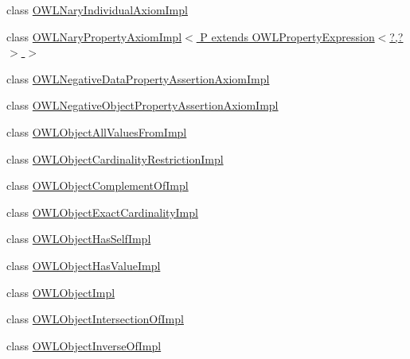 \begin{DoxyCompactItemize}
\item 
class \hyperlink{classuk_1_1ac_1_1manchester_1_1cs_1_1owl_1_1owlapi_1_1_o_w_l_nary_individual_axiom_impl}{O\-W\-L\-Nary\-Individual\-Axiom\-Impl}
\item 
class \hyperlink{classuk_1_1ac_1_1manchester_1_1cs_1_1owl_1_1owlapi_1_1_o_w_l_nary_property_axiom_impl_3_01_p_01ebb131bf5bfcb769e964dbdcf75a7ae4d}{O\-W\-L\-Nary\-Property\-Axiom\-Impl$<$ P extends O\-W\-L\-Property\-Expression$<$?,?$>$ $>$}
\item 
class \hyperlink{classuk_1_1ac_1_1manchester_1_1cs_1_1owl_1_1owlapi_1_1_o_w_l_negative_data_property_assertion_axiom_impl}{O\-W\-L\-Negative\-Data\-Property\-Assertion\-Axiom\-Impl}
\item 
class \hyperlink{classuk_1_1ac_1_1manchester_1_1cs_1_1owl_1_1owlapi_1_1_o_w_l_negative_object_property_assertion_axiom_impl}{O\-W\-L\-Negative\-Object\-Property\-Assertion\-Axiom\-Impl}
\item 
class \hyperlink{classuk_1_1ac_1_1manchester_1_1cs_1_1owl_1_1owlapi_1_1_o_w_l_object_all_values_from_impl}{O\-W\-L\-Object\-All\-Values\-From\-Impl}
\item 
class \hyperlink{classuk_1_1ac_1_1manchester_1_1cs_1_1owl_1_1owlapi_1_1_o_w_l_object_cardinality_restriction_impl}{O\-W\-L\-Object\-Cardinality\-Restriction\-Impl}
\item 
class \hyperlink{classuk_1_1ac_1_1manchester_1_1cs_1_1owl_1_1owlapi_1_1_o_w_l_object_complement_of_impl}{O\-W\-L\-Object\-Complement\-Of\-Impl}
\item 
class \hyperlink{classuk_1_1ac_1_1manchester_1_1cs_1_1owl_1_1owlapi_1_1_o_w_l_object_exact_cardinality_impl}{O\-W\-L\-Object\-Exact\-Cardinality\-Impl}
\item 
class \hyperlink{classuk_1_1ac_1_1manchester_1_1cs_1_1owl_1_1owlapi_1_1_o_w_l_object_has_self_impl}{O\-W\-L\-Object\-Has\-Self\-Impl}
\item 
class \hyperlink{classuk_1_1ac_1_1manchester_1_1cs_1_1owl_1_1owlapi_1_1_o_w_l_object_has_value_impl}{O\-W\-L\-Object\-Has\-Value\-Impl}
\item 
class \hyperlink{classuk_1_1ac_1_1manchester_1_1cs_1_1owl_1_1owlapi_1_1_o_w_l_object_impl}{O\-W\-L\-Object\-Impl}
\item 
class \hyperlink{classuk_1_1ac_1_1manchester_1_1cs_1_1owl_1_1owlapi_1_1_o_w_l_object_intersection_of_impl}{O\-W\-L\-Object\-Intersection\-Of\-Impl}
\item 
class \hyperlink{classuk_1_1ac_1_1manchester_1_1cs_1_1owl_1_1owlapi_1_1_o_w_l_object_inverse_of_impl}{O\-W\-L\-Object\-Inverse\-Of\-Impl}

\end{DoxyCompactItemize}
